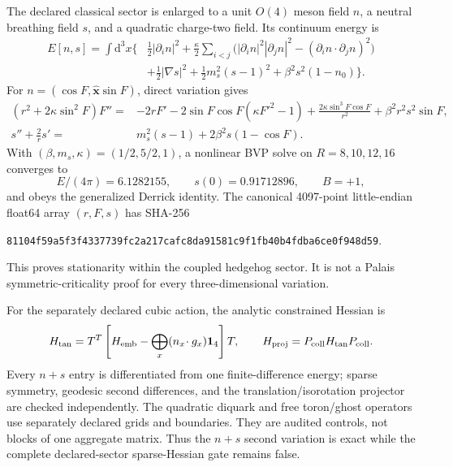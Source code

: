 \documentclass[11pt]{article}
\numberwithin{equation}{section}
\newcommand{\dd}{\mathrm d}
\begin{document}
The declared classical sector is enlarged to a unit \(O(4)\) meson field
\(n\), a neutral breathing field \(s\), and a quadratic charge-two field.
Its continuum energy is
\begin{align}
 E[n,s]=\int\!\dd^3x\bigg\{&\frac12|\partial_i n|^2
 +\frac\kappa2\sum_{i<j}
 \bigl(|\partial_i n|^2|\partial_jn|^2
 -(\partial_i n\!\cdot\!\partial_jn)^2\bigr)\nonumber\\
 &+\frac12|\nabla s|^2+\frac12m_s^2(s-1)^2
 +\beta^2s^2(1-n_0)\bigg\}.
 \label{eq:e6-coupled-energy}
\end{align}
For \(n=(\cos F,\widehat{\bm x}\sin F)\), direct variation gives
\begin{align}
 (r^2+2\kappa\sin^2F)F''={}&-2rF'
 -2\sin F\cos F(\kappa F'^2-1)
 +\frac{2\kappa\sin^3F\cos F}{r^2}
 +\beta^2r^2s^2\sin F,\nonumber\\
 s''+\frac2r s'={}&m_s^2(s-1)+2\beta^2s(1-\cos F).
 \label{eq:e6-coupled-bvp}
\end{align}
With \((\beta,m_s,\kappa)=(1/2,5/2,1)\), a nonlinear BVP solve on
\(R=8,10,12,16\) converges to
\begin{equation}
 E/(4\pi)=6.1282155,\qquad s(0)=0.91712896,\qquad B=+1,
 \label{eq:e6-bvp-anchor}
\end{equation}
and obeys the generalized Derrick identity.  The canonical 4097-point
little-endian float64 array \((r,F,s)\) has SHA-256
\begin{center}
\texttt{81104f59a5f3f4337739fc2a217cafc8da91581c9f1fb40b4fdba6ce0f948d59}.
\end{center}
This proves stationarity within the coupled hedgehog sector.  It is not a
Palais symmetric-criticality proof for every three-dimensional variation.

For the separately declared cubic action, the analytic constrained Hessian
is
\begin{equation}
 H_{\rm tan}=T^T\left[H_{\rm emb}
 -\bigoplus_x(n_x\!\cdot g_x)\bm1_4\right]T,
 \qquad
 H_{\rm proj}=P_{\rm coll}H_{\rm tan}P_{\rm coll}.
 \label{eq:e6-projected-hessian}
\end{equation}
Every \(n+s\) entry is differentiated from one finite-difference energy;
sparse symmetry, geodesic second differences, and the
translation/isorotation projector are checked independently.  The quadratic
diquark and free toron/ghost operators use separately declared grids and
boundaries.  They are audited controls, not blocks of one aggregate matrix.
Thus the \(n+s\) second variation is exact while the complete declared-sector
sparse-Hessian gate remains false.
\end{document}
